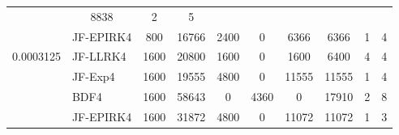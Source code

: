 \begin{table}[htb]
\begin{adjustbox}{width=0.9\columnwidth,center}
\begin{tabular}{cccccccccc}
			& 8838 & 2 & 5 \\
			\multicolumn{1}{l}{} & \multicolumn{1}{l}{JF-EPIRK4} & 800 & 16766 & 2400 & 0 &
			6366 & 6366 & 1 & 4 \\
			\multicolumn{1}{l}{0.0003125} & \multicolumn{1}{l}{JF-LLRK4} & 1600 & 20800
			& 1600 & 0 & 1600 & 6400 & 4 & 4 \\
			\multicolumn{1}{l}{} & \multicolumn{1}{l}{JF-Exp4} & 1600 & 19555 & 4800 & 0
			& 11555 & 11555 & 1 & 4 \\
			\multicolumn{1}{l}{} & \multicolumn{1}{l}{BDF4} & 1600 & 58643 & 0 & 4360 & 0
			& 17910 & 2 & 8 \\
			\multicolumn{1}{l}{} & \multicolumn{1}{l}{JF-EPIRK4} & 1600 & 31872 & 4800 & 0 &
			11072 & 11072 & 1 & 3 \\
			\hline
		\end{tabular}
	\end{adjustbox}
	\label{tab:bg}
\end{table}


